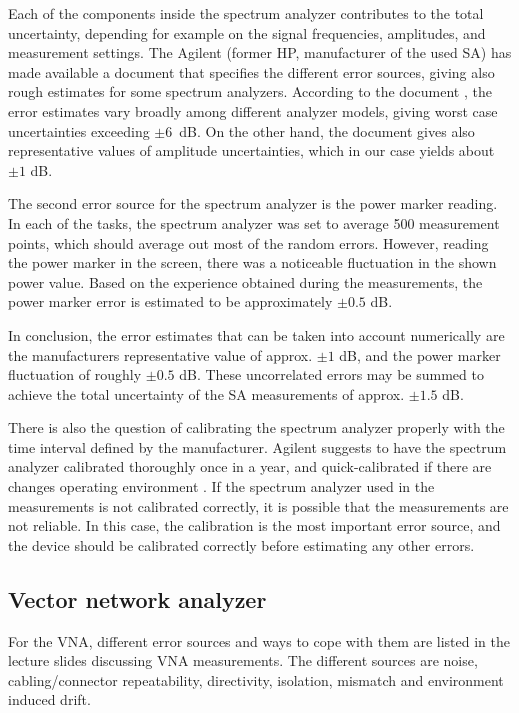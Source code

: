 \documentclass[a4paper, 12pt]{article}
\begin{document}
Each of the components inside the spectrum analyzer contributes to the total uncertainty, 
depending for example on the signal frequencies, amplitudes, and measurement settings. 
The Agilent (former HP, manufacturer of the used SA) has made available a document that 
specifies the different error sources, giving also rough estimates for some spectrum 
analyzers. According to the document \cite{sa}, the error estimates vary broadly among 
different analyzer models, giving worst case uncertainties exceeding $\pm 6$~dB. On the 
other hand, the document gives also representative values of amplitude uncertainties, 
which in our case yields about $\pm 1$ dB.

The second error source for the spectrum analyzer is the power marker reading. In 
each of the tasks, the spectrum analyzer was set to average 500 measurement points, 
which should average out most of the random errors. However, reading the power marker 
in the screen, there was a noticeable fluctuation in the shown power value. Based on the 
experience obtained during the measurements, the power marker error is estimated to be 
approximately $\pm 0.5$ dB.

In conclusion, the error estimates that can be taken into account numerically are 
the manufacturers representative value of approx. $\pm 1$ dB, and the power marker 
fluctuation of roughly $\pm 0.5$ dB. These uncorrelated errors may be summed to 
achieve the total uncertainty of the SA measurements of approx. $\pm 1.5$ dB. 

There is also the question of calibrating the spectrum analyzer properly with 
the time interval defined by the manufacturer. Agilent suggests to have the spectrum 
analyzer calibrated thoroughly once in a year, and quick-calibrated if there are 
changes operating environment \cite{sa2}. If the spectrum analyzer used in the 
measurements is not calibrated correctly, it is possible that the measurements are 
not reliable. In this case, the calibration is the most important error source, and 
the device should be calibrated correctly before estimating any other errors.


\subsection{Vector network analyzer}

For the VNA, different error sources and ways to cope with them are listed in the 
lecture slides discussing VNA measurements. The different sources are noise, 
cabling/connector repeatability, directivity, isolation, mismatch and environment 
induced drift. 
\end{document}
